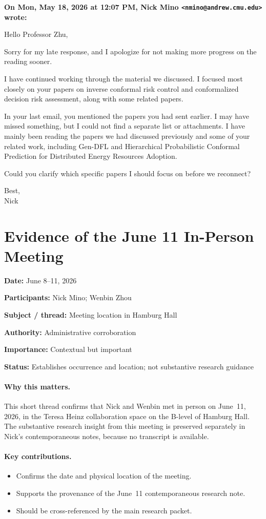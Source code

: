 \documentclass[11pt]{article}
\newcommand{\Meta}[2]{%
  \par\noindent\textbf{#1:} #2\par\nobreak
}
\newcommand{\Email}[3]{%
  \medskip\noindent\textbf{On #1, #2 wrote:}\par\nobreak
  \begingroup\RaggedRight #3\par\endgroup
}
\begin{document}
\Email{Mon, May 18, 2026 at 12:07 PM}{Nick Mino
\texttt{<nmino@andrew.cmu.edu>}}{%
Hello Professor Zhu,

Sorry for my late response, and I apologize for not making more progress on
the reading sooner.

I have continued working through the material we discussed. I focused most
closely on your papers on inverse conformal risk control and conformalized
decision risk assessment, along with some related papers.

In your last email, you mentioned the papers you had sent earlier. I may have
missed something, but I could not find a separate list or attachments. I have
mainly been reading the papers we had discussed previously and some of your
related work, including Gen-DFL and Hierarchical Probabilistic Conformal
Prediction for Distributed Energy Resources Adoption.

Could you clarify which specific papers I should focus on before we reconnect?

Best,\\
Nick}

\clearpage
\section{Evidence of the June 11 In-Person Meeting}

\Meta{Date}{June 8--11, 2026}
\Meta{Participants}{Nick Mino; Wenbin Zhou}
\Meta{Subject / thread}{Meeting location in Hamburg Hall}
\Meta{Authority}{Administrative corroboration}
\Meta{Importance}{Contextual but important}
\Meta{Status}{Establishes occurrence and location; not substantive research
guidance}

\paragraph{Why this matters.}
This short thread confirms that Nick and Wenbin met in person on June~11, 2026,
in the Teresa Heinz collaboration space on the B-level of Hamburg Hall. The
substantive research insight from this meeting is preserved separately in
Nick's contemporaneous notes, because no transcript is available.

\paragraph{Key contributions.}
\begin{itemize}[leftmargin=*,itemsep=0.25em]
  \item Confirms the date and physical location of the meeting.
  \item Supports the provenance of the June~11 contemporaneous research note.
  \item Should be cross-referenced by the main research packet.
\end{itemize}
\end{document}
